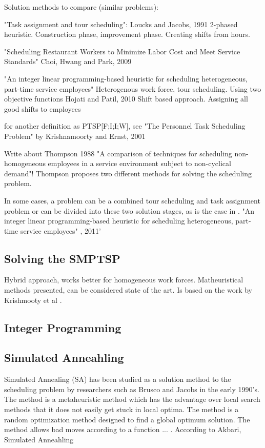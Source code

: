 Solution methods to compare (similar problems):

"Task assignment and tour scheduling": Loucks and Jacobs, 1991
2-phased heuristic. Construction phase, improvement phase.
Creating shifts from hours.



"Scheduling Restaurant Workers to Minimize Labor Cost and Meet Service Standards" Choi, Hwang and Park, 2009

"An integer linear programming-based heuristic for scheduling heterogeneous, part-time service employees" Heterogenous work force, tour scheduling. Using two objective functions Hojati and Patil, 2010 
Shift based approach. Assigning all good shifts to employees


for another definition as PTSP[F;I;I;W], see "The Personnel Task Scheduling Problem" by Krishnamoorty and Ernst, 2001

Write about Thompson 1988 "A comparison of techniques for scheduling non-homogeneous employees in a service environment subject to non-cyclical demand"! Thompson proposes two different methods for solving the scheduling problem.

In some cases, a problem can be a combined tour scheduling and task assignment problem or can be divided into these two solution stages, as is the case in \cite{keylist}. "An integer linear programming-based heuristic for scheduling heterogeneous, part-time service employees" , 2011'

\subsection{Solving the SMPTSP}
\cite{smet_2014}
Hybrid approach, works better for homogeneous work forces. Matheuristical methods presented, can be considered state of the art. Is based on the work by Krishmooty et al \cite{krishnamoorthy_2012}.

\subsection{Integer Programming}

\subsection{Simulated Anneahling}

Simulated Annealing (SA) has been studied as a solution method to the scheduling problem by researchers such as Brusco and Jacobs in the early 1990's. The method is a metaheuristic method which has the advantage over local search methods that it does not easily get stuck in local optima. The method is a random optimization method designed to find a global optimum solution. The method allows bad moves according to a function ... . 
According to Akbari, Simulated Anneahling 

